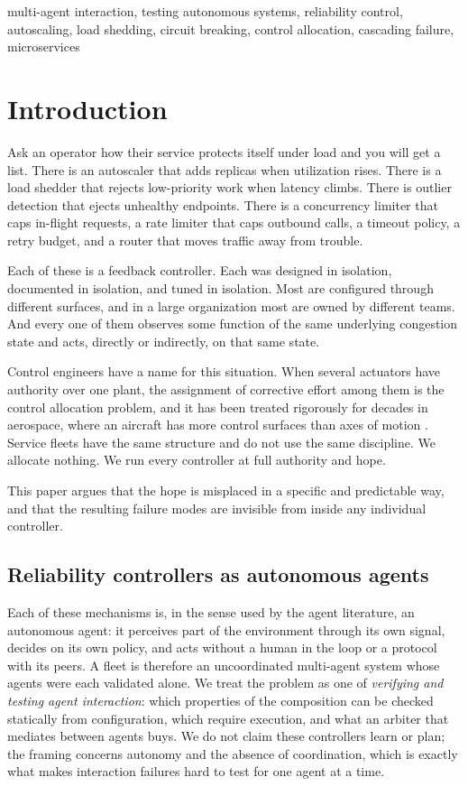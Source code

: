 \documentclass[conference]{IEEEtran}
\begin{document}
\begin{IEEEkeywords}
multi-agent interaction, testing autonomous systems, reliability control, autoscaling, load shedding, circuit breaking, control
allocation, cascading failure, microservices
\end{IEEEkeywords}

\section{Introduction}

Ask an operator how their service protects itself under load and you will
get a list. There is an autoscaler that adds replicas when utilization
rises. There is a load shedder that rejects low-priority work when latency
climbs. There is outlier detection that ejects unhealthy endpoints. There is
a concurrency limiter that caps in-flight requests, a rate limiter that caps
outbound calls, a timeout policy, a retry budget, and a router that moves
traffic away from trouble.

Each of these is a feedback controller. Each was designed in isolation,
documented in isolation, and tuned in isolation. Most are configured through
different surfaces, and in a large organization most are owned by different
teams. And every one of them observes some function of the same underlying
congestion state and acts, directly or indirectly, on that same state.

Control engineers have a name for this situation. When several actuators
have authority over one plant, the assignment of corrective effort among
them is the control allocation problem, and it has been treated rigorously
for decades in aerospace, where an aircraft has more control surfaces than
axes of motion \cite{durham1993,johansen2013}. Service fleets have the same
structure and do not use the same discipline. We allocate nothing. We run
every controller at full authority and hope.

This paper argues that the hope is misplaced in a specific and predictable
way, and that the resulting failure modes are invisible from inside any
individual controller.

\subsection{Reliability controllers as autonomous agents}

Each of these mechanisms is, in the sense used by the agent literature, an
autonomous agent: it perceives part of the environment through its own
signal, decides on its own policy, and acts without a human in the loop or a
protocol with its peers. A fleet is therefore an uncoordinated multi-agent
system whose agents were each validated alone. We treat the problem as one
of \emph{verifying and testing agent interaction}: which properties of the
composition can be checked statically from configuration, which require
execution, and what an arbiter that mediates between agents buys. We do not
claim these controllers learn or plan; the framing concerns autonomy and the
absence of coordination, which is exactly what makes interaction failures
hard to test for one agent at a time.
\end{document}
